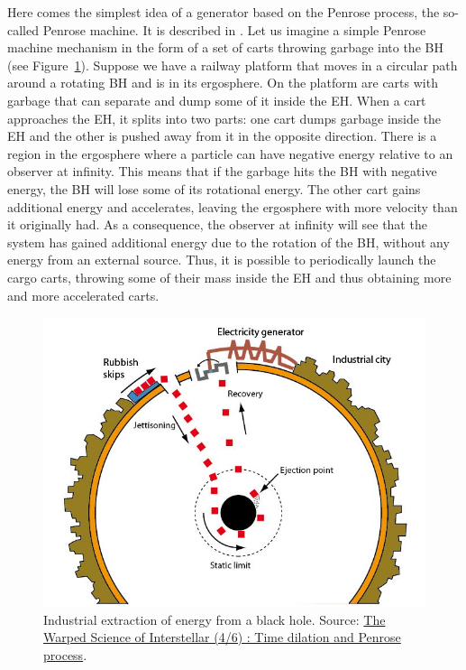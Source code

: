 \documentclass[fleqn,usenatbib]{mnras}
\begin{document}
Here comes the simplest idea of a generator based on the Penrose process, the so-called Penrose machine. It is described in \cite{misner1973}. Let us imagine a simple Penrose machine mechanism in the form of a set of carts throwing garbage into the BH (see Figure~\ref{fig:penrose_machine}). Suppose we have a railway platform that moves in a circular path around a rotating BH and is in its ergosphere. On the platform are carts with garbage that can separate and dump some of it inside the EH. When a cart approaches the EH, it splits into two parts: one cart dumps garbage inside the EH and the other is pushed away from it in the opposite direction. There is a region in the ergosphere where a particle can have negative energy relative to an observer at infinity. This means that if the garbage hits the BH with negative energy, the BH will lose some of its rotational energy. The other cart gains additional energy and accelerates, leaving the ergosphere with more velocity than it originally had. As a consequence, the observer at infinity will see that the system has gained additional energy due to the rotation of the BH, without any energy from an external source. Thus, it is possible to periodically launch the cargo carts, throwing some of their mass inside the EH and thus obtaining more and more accelerated carts.

\begin{figure} 
	\includegraphics[width=\columnwidth]{figures/penrose_machine.jpg}
	\caption{Industrial extraction of energy from a black hole. Source: \href{https://blogs.futura-sciences.com/e-luminet/2016/01/16/warped-science-interstellar-46-time-dilation-penrose-process/}{The Warped Science of Interstellar (4/6) : Time dilation and Penrose process}.}
	\label{fig:penrose_machine}
\end{figure}
\end{document}
